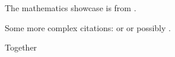 \documentclass{article}
\begin{document}
	The mathematics showcase is from \autocite{Graham1995}.
	
	Some more complex citations: \parencite{Graham1995} or
	\textcite{Thomas2008} or possibly .
	
	\autocite[56]{Thomas2008}
	
	\autocite[See][45-48]{Graham1995}
	
	Together \autocite{Thomas2008,Graham1995}
	
	\printbibliography
\end{document}
